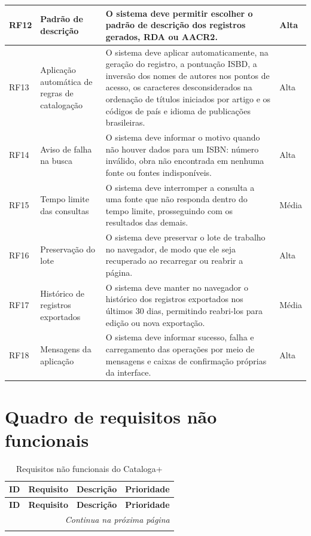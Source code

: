 \begin{apendicesenv}
\begin{longtable}{|p{}|p{}|p{}|p{}|}
    RF12 & Padrão de descrição & O sistema deve permitir escolher o padrão de descrição dos registros gerados, RDA ou AACR2. & Alta \\ \hline
    RF13 & Aplicação automática de regras de catalogação & O sistema deve aplicar automaticamente, na geração do registro, a pontuação ISBD, a inversão dos nomes de autores nos pontos de acesso, os caracteres desconsiderados na ordenação de títulos iniciados por artigo e os códigos de país e idioma de publicações brasileiras. & Alta \\ \hline
    RF14 & Aviso de falha na busca & O sistema deve informar o motivo quando não houver dados para um ISBN: número inválido, obra não encontrada em nenhuma fonte ou fontes indisponíveis. & Alta \\ \hline
    RF15 & Tempo limite das consultas & O sistema deve interromper a consulta a uma fonte que não responda dentro do tempo limite, prosseguindo com os resultados das demais. & Média \\ \hline
    RF16 & Preservação do lote & O sistema deve preservar o lote de trabalho no navegador, de modo que ele seja recuperado ao recarregar ou reabrir a página. & Alta \\ \hline
    RF17 & Histórico de registros exportados & O sistema deve manter no navegador o histórico dos registros exportados nos últimos 30 dias, permitindo reabri-los para edição ou nova exportação. & Média \\ \hline
    RF18 & Mensagens da aplicação & O sistema deve informar sucesso, falha e carregamento das operações por meio de mensagens e caixas de confirmação próprias da interface. & Alta \\ \hline
\end{longtable}

\chapter{Quadro de requisitos não funcionais}
\label{ape:rnf}

\begin{longtable}{|p{}|p{}|p{}|p{}|}
    \caption{Requisitos não funcionais do Cataloga+}
    \label{qua:rnf} \\
    \hline
    \textbf{ID} & \textbf{Requisito} & \textbf{Descrição} & \textbf{Prioridade} \\ \hline
    \endfirsthead
    \hline
    \textbf{ID} & \textbf{Requisito} & \textbf{Descrição} & \textbf{Prioridade} \\ \hline
    \endhead
    \hline \multicolumn{4}{r}{\textit{Continua na próxima página}} \\
    \endfoot
    \hline
    \endlastfoot


\end{longtable}
\end{apendicesenv}
